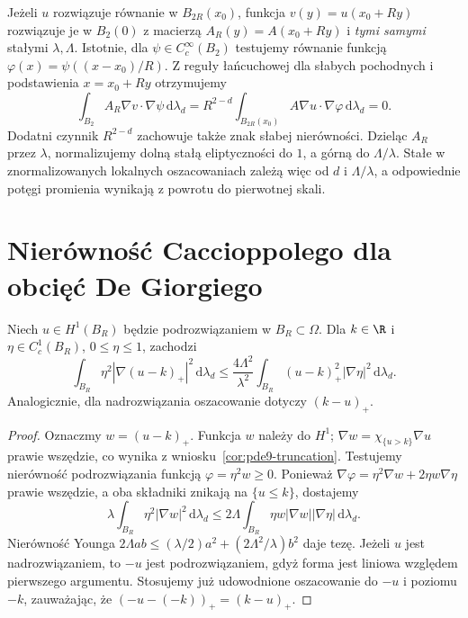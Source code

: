 Jeżeli $u$ rozwiązuje równanie w $B_{2R}(x_0)$, funkcja
$v(y)=u(x_0+Ry)$ rozwiązuje je w $B_2(0)$ z macierzą
$A_R(y)=A(x_0+Ry)$ i \emph{tymi samymi} stałymi $\lambda,\Lambda$.
Istotnie, dla $\psi\in C_c^\infty(B_2)$ testujemy równanie
funkcją $\varphi(x)=\psi((x-x_0)/R)$. Z reguły łańcuchowej
dla słabych pochodnych i podstawienia $x=x_0+Ry$ otrzymujemy
\[
 \int_{B_2} A_R\nabla v\cdot\nabla\psi\,\mathrm d\lambda_d
 =R^{2-d}\int_{B_{2R}(x_0)}
 A\nabla u\cdot\nabla\varphi\,\mathrm d\lambda_d=0.
\]
Dodatni czynnik $R^{2-d}$ zachowuje także znak słabej
nierówności. Dzieląc $A_R$ przez $\lambda$, normalizujemy
dolną stałą eliptyczności do $1$, a górną do $\Lambda/\lambda$.
Stałe w znormalizowanych lokalnych oszacowaniach zależą
więc od $d$ i $\Lambda/\lambda$, a odpowiednie potęgi
promienia wynikają z powrotu do pierwotnej skali.

\section{Nierówność Caccioppolego dla obcięć De Giorgiego}
\label{sec:pde17-caccioppoli}
\begin{lemat}
\label{lem:pde17-caccioppoli}
Niech $u\in H^1(B_R)$ będzie podrozwiązaniem w $B_R\subset\Omega$.
Dla $k\in\R$ i $\eta\in C_c^1(B_R)$, $0\le\eta\le1$, zachodzi
\begin{equation}\label{eq:pde17-cacc}
 \int_{B_R}\eta^2|\nabla(u-k)_+|^2\,\mathrm d\lambda_d
 \le \frac{4\Lambda^2}{\lambda^2}
 \int_{B_R}(u-k)_+^2|\nabla\eta|^2\,\mathrm d\lambda_d.
\end{equation}
Analogicznie, dla nadrozwiązania oszacowanie dotyczy $(k-u)_+$.
\end{lemat}
\begin{proof}
Oznaczmy $w=(u-k)_+$. Funkcja $w$ należy do $H^1$;
$\nabla w=\chi_{\{u>k\}}\nabla u$ prawie wszędzie,
co wynika z wniosku~\ref{cor:pde9-truncation}.
Testujemy nierówność podrozwiązania funkcją $\varphi=\eta^2w\ge0$.
Ponieważ $\nabla\varphi=\eta^2\nabla w+2\eta w\nabla\eta$
prawie wszędzie, a oba składniki znikają na $\{u\le k\}$,
dostajemy
\[
 \lambda\int_{B_R}\eta^2|\nabla w|^2\,\mathrm d\lambda_d
 \le 2\Lambda\int_{B_R}\eta w|\nabla w||\nabla\eta|\,\mathrm d\lambda_d.
\]
Nierówność Younga
$2\Lambda ab\le(\lambda/2)a^2+(2\Lambda^2/\lambda)b^2$
daje tezę. Jeżeli $u$ jest nadrozwiązaniem, to $-u$
jest podrozwiązaniem, gdyż forma jest liniowa względem
pierwszego argumentu. Stosujemy już udowodnione oszacowanie
do $-u$ i poziomu $-k$, zauważając, że
$(-u-(-k))_+=(k-u)_+$.
\end{proof}

